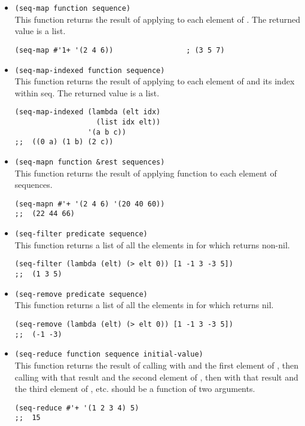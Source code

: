 \begin{itemize}
\item \lstinline|(seq-map function sequence)|\\
  This function returns the result of applying  to each element of .
  The returned value is a list.
\begin{lstlisting}
(seq-map #'1+ '(2 4 6))                 ; (3 5 7)
\end{lstlisting}
\item \lstinline|(seq-map-indexed function sequence)|\\
  This function returns the result of applying  to each element of  and its index within seq.
  The returned value is a list.
\begin{lstlisting}
(seq-map-indexed (lambda (elt idx)
                   (list idx elt))
                 '(a b c))
;;  ((0 a) (1 b) (2 c))
\end{lstlisting}
\item \lstinline|(seq-mapn function &rest sequences)|\\
  This function returns the result of applying function to each element of sequences.
\begin{lstlisting}
(seq-mapn #'+ '(2 4 6) '(20 40 60))
;;  (22 44 66)
\end{lstlisting}
\item \lstinline|(seq-filter predicate sequence)|\\
  This function returns a list of all the elements in  for which  returns non-nil.
\begin{lstlisting}
(seq-filter (lambda (elt) (> elt 0)) [1 -1 3 -3 5])
;;  (1 3 5)
\end{lstlisting}
\item \lstinline|(seq-remove predicate sequence)|\\
  This function returns a list of all the elements in  for which  returns nil.
\begin{lstlisting}
(seq-remove (lambda (elt) (> elt 0)) [1 -1 3 -3 5])
;;  (-1 -3)
\end{lstlisting}
  
\item \lstinline|(seq-reduce function sequence initial-value)|\\
  This function returns the result of calling  with  and the first element of , then calling  with that result and the second element of , then with that result and the third element of , etc.
   should be a function of two arguments.
\begin{lstlisting}
(seq-reduce #'+ '(1 2 3 4) 5)
;;  15
\end{lstlisting}
  

\end{itemize}
